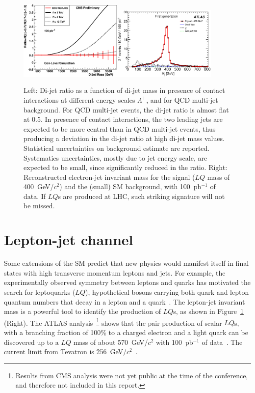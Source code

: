 \documentclass{cmspaper}
\begin{document}
\begin{figure}[htbp] 
\centering
\includegraphics[width=0.45\textwidth]{DiJetRatio100pbOptFix.eps}\includegraphics[width=0.45\textwidth]{Mejfig5R.eps}  
\caption{Left: Di-jet ratio as a function of di-jet mass in presence of 
contact interactions at different energy scales $\Lambda^{+}$, 
and for QCD multi-jet background. 
For QCD multi-jet events, the di-jet ratio is almost flat at 0.5. 
In presence of contact interactions, the two 
leading jets are expected to be more central than in QCD multi-jet events, 
thus producing a deviation in the di-jet ratio at high di-jet mass values.
Statistical uncertainties on background estimate are reported.  
Systematics uncertainties, mostly due to jet energy scale, are expected to be small, 
since significantly reduced in the ratio.
Right: Reconstructed electron-jet invariant mass for the signal 
($LQ$ mass of 400~GeV/$c^2$) and the (small) SM background, 
with 100~pb$^{-1}$ of data. If $LQ$s are produced at LHC, 
such striking signature will not be missed.}
\label{fig:DiJetRatioAndLQMej}
\end{figure}

\section{Lepton-jet channel} \label{leptonjet}
Some extensions of the SM predict that new physics would manifest itself in 
final states with high transverse momentum leptons and jets.
For example, the experimentally observed symmetry between 
leptons and quarks has motivated the search for leptoquarks ($LQ$), 
hypothetical bosons carrying both quark and lepton quantum numbers 
that decay in a lepton and a quark~\cite{Acosta:1999ws}.
The lepton-jet invariant mass is a powerful tool to identify the production 
of $LQ$s, as shown in Figure~\ref{fig:DiJetRatioAndLQMej} (Right). 
The ATLAS analysis~\footnote{Results from CMS analysis were not yet public at the time 
of the conference, and therefore not included in this report.} 
shows that the pair production of scalar $LQ$s, with a branching fraction of 100\% 
to a charged electron and a light quark can be discovered up to a $LQ$ 
mass of about 570~GeV/$c^2$ with 100~pb$^{-1}$ of data~\cite{LQATLAS}. 
The current limit from Tevatron is 256~GeV/$c^2$~\cite{Abazov:2004mk}.
\end{document}
